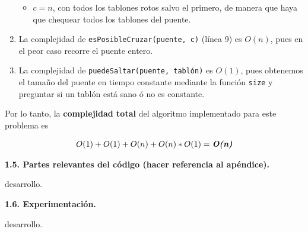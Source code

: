 \begin{enumerate}
\begin{itemize}
    \item $c = n$, con todos los tablones rotos salvo el primero, de manera que haya que chequear todos los tablones del puente.
  \end{itemize}

\item La complejidad de \verb|esPosibleCruzar(puente, c)| (línea 9) es $O(n)$, pues en el peor caso recorre el puente entero.

\item La complejidad de \verb|puedeSaltar(puente, tablón)| es $O(1)$, pues obtenemos el tamaño del puente en tiempo constante
mediante la función \verb|size| y preguntar si un tablón está sano ó no es constante.

\end{enumerate}

Por lo tanto, la \textbf{complejidad total} del algoritmo implementado para este problema es

\begin{align*}
  O(1) + O(1) + O(n) + O(n)*O(1) = \textit{\textbf{O(n)}}
\end{align*}



\vspace*{0.75cm} \noindent



\noindent
\textbf{1.5. Partes relevantes del código (hacer referencia al apéndice).}

\vspace*{0.3cm}

desarrollo.


\vspace*{0.75cm} \noindent



\noindent
\textbf{1.6. Experimentación.}

\vspace*{0.3cm}

desarrollo.
